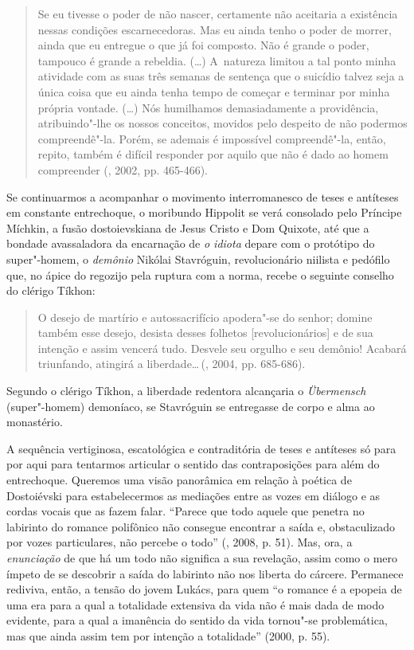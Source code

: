 \begin{quote}
Se eu tivesse o poder de não nascer, certamente não aceitaria a
existência nessas condições escarnecedoras. Mas eu ainda tenho o poder
de morrer, ainda que eu entregue o que já foi composto. Não é grande o
poder, tampouco é grande a rebeldia. (\ldots) A~natureza limitou a tal
ponto minha atividade com as suas três semanas de sentença que o
suicídio talvez seja a única coisa que eu ainda tenha tempo de começar e
terminar por minha própria vontade. (\ldots) Nós humilhamos demasiadamente
a providência, atribuindo"-lhe os nossos conceitos, movidos pelo despeito
de não podermos compreendê"-la. Porém, se ademais é impossível
compreendê"-la, então, repito, também é difícil responder por aquilo que
não é dado ao homem compreender (, 2002, pp. 465-466).
\end{quote}

Se continuarmos a acompanhar o movimento interromanesco de teses e
antíteses em constante entrechoque, o moribundo Hippolit se verá
consolado pelo Príncipe Míchkin, a fusão dostoievskiana de Jesus Cristo
e Dom Quixote, até que a bondade avassaladora da encarnação de \emph{o
idiota} depare com o protótipo do super"-homem, o \emph{demônio} Nikólai
Stavróguin, revolucionário niilista e pedófilo que, no ápice do regozijo
pela ruptura com a norma, recebe o seguinte conselho do clérigo Tíkhon:

\begin{quote}
O desejo de martírio e autossacrifício apodera"-se do senhor; domine
também esse desejo, desista desses folhetos {[}revolucionários{]} e de
sua intenção e assim vencerá tudo. Desvele seu orgulho e seu demônio!
Acabará triunfando, atingirá a liberdade\ldots \,(, 2004, pp.
685-686).
\end{quote}

Segundo o clérigo Tíkhon, a liberdade redentora alcançaria o
\emph{Übermensch} (super"-homem) demoníaco, se Stavróguin se entregasse
de corpo e alma ao monastério.

A sequência vertiginosa, escatológica e contraditória de teses e
antíteses só para por aqui para tentarmos articular o sentido das
contraposições para além do entrechoque. Queremos uma visão panorâmica
em relação à poética de Dostoiévski para estabelecermos as mediações
entre as vozes em diálogo e as cordas vocais que as fazem falar.
``Parece que todo aquele que penetra no labirinto do romance polifônico
não consegue encontrar a saída e, obstaculizado por vozes particulares,
não percebe o todo'' (, 2008, p. 51). Mas, ora, a
\emph{enunciação} de que há um todo não significa a sua revelação, assim
como o mero ímpeto de se descobrir a saída do labirinto não nos liberta
do cárcere. Permanece rediviva, então, a tensão do jovem Lukács, para
quem ``o romance é a epopeia de uma era para a qual a totalidade
extensiva da vida não é mais dada de modo evidente, para a qual a
imanência do sentido da vida tornou"-se problemática, mas que ainda assim
tem por intenção a totalidade'' (2000, p. 55).

